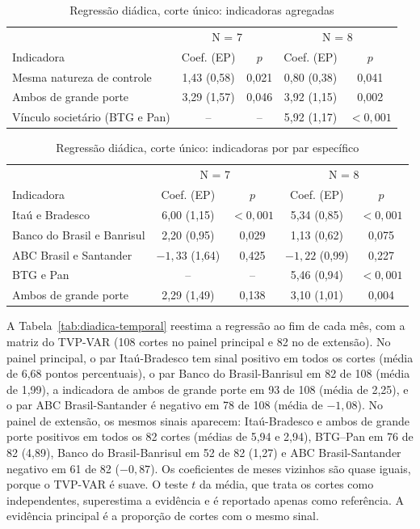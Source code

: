 \begin{table}[!htbp]
\centering
\caption{Regressão diádica, corte único: indicadoras agregadas}
\label{tab:diadica-agregada}
\small
\begin{tabular}{lcccc}
\toprule
 & \multicolumn{2}{c}{N = 7} & \multicolumn{2}{c}{N = 8} \\
Indicadora & Coef. (EP) & $p$ & Coef. (EP) & $p$ \\
\midrule
Mesma natureza de controle     & 1,43 (0,58) & 0,021 & 0,80 (0,38) & 0,041 \\
Ambos de grande porte          & 3,29 (1,57) & 0,046 & 3,92 (1,15) & 0,002 \\
Vínculo societário (BTG e Pan) & --          & --    & 5,92 (1,17) & $<0{,}001$ \\
\bottomrule
\end{tabular}
\end{table}

\begin{table}[!htbp]
\centering
\caption{Regressão diádica, corte único: indicadoras por par específico}
\label{tab:diadica-par}
\small
\begin{tabular}{lcccc}
\toprule
 & \multicolumn{2}{c}{N = 7} & \multicolumn{2}{c}{N = 8} \\
Indicadora & Coef. (EP) & $p$ & Coef. (EP) & $p$ \\
\midrule
Itaú e Bradesco            & 6,00 (1,15) & $<0{,}001$ & 5,34 (0,85) & $<0{,}001$ \\
Banco do Brasil e Banrisul & 2,20 (0,95) & 0,029 & 1,13 (0,62) & 0,075 \\
ABC Brasil e Santander     & $-1{,}33$ (1,64) & 0,425 & $-1{,}22$ (0,99) & 0,227 \\
BTG e Pan                  & --          & --    & 5,46 (0,94) & $<0{,}001$ \\
Ambos de grande porte      & 2,29 (1,49) & 0,138 & 3,10 (1,01) & 0,004 \\
\bottomrule
\end{tabular}
\end{table}

A Tabela~\ref{tab:diadica-temporal} reestima a regressão ao fim de cada mês, com a
matriz do TVP-VAR (108 cortes no painel principal e 82 no de extensão). No painel
principal, o par Itaú-Bradesco tem sinal positivo em todos os cortes (média de
6,68 pontos percentuais), o par Banco do Brasil-Banrisul em 82 de 108 (média de
1,99), a indicadora de ambos de grande porte em 93 de 108 (média de 2,25), e o par
ABC Brasil-Santander é negativo em 78 de 108 (média de $-1{,}08$). No painel de
extensão, os mesmos sinais aparecem: Itaú-Bradesco e ambos de grande porte
positivos em todos os 82 cortes (médias de 5,94 e 2,94), BTG--Pan em 76 de 82
(4,89), Banco do Brasil-Banrisul em 52 de 82 (1,27) e ABC Brasil-Santander
negativo em 61 de 82 ($-0{,}87$). Os coeficientes de meses vizinhos são quase iguais, porque o TVP-VAR é suave. O teste
$t$ da média, que trata os cortes como independentes, superestima a evidência e é
reportado apenas como referência. A evidência principal é a proporção de cortes com
o mesmo sinal.

